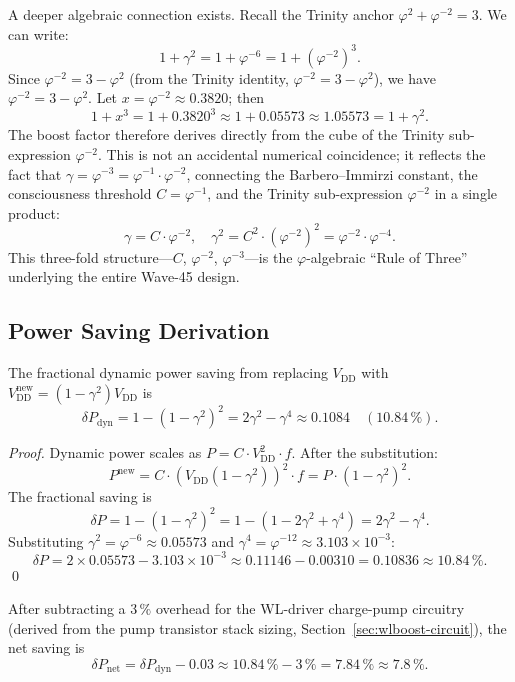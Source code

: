 A deeper algebraic connection exists.  Recall the Trinity anchor
$\varphi^{2} + \varphi^{-2} = 3$.  We can write:
\[
  1 + \gamma^{2} = 1 + \varphi^{-6}
  = 1 + (\varphi^{-2})^{3}.
\]
Since $\varphi^{-2} = 3 - \varphi^{2}$ (from the Trinity identity,
$\varphi^{-2} = 3 - \varphi^{2}$), we have
$\varphi^{-2} = 3 - \varphi^{2}$.  Let $x = \varphi^{-2}
\approx 0.3820$; then
\[
  1 + x^{3} = 1 + 0.3820^{3} \approx 1 + 0.05573 \approx 1.05573
  = 1 + \gamma^{2}.
\]
The boost factor therefore derives directly from the cube of the
Trinity sub-expression $\varphi^{-2}$.  This is not an accidental
numerical coincidence; it reflects the fact that $\gamma = \varphi^{-3}
= \varphi^{-1} \cdot \varphi^{-2}$, connecting the Barbero--Immirzi
constant, the consciousness threshold $C = \varphi^{-1}$, and the
Trinity sub-expression $\varphi^{-2}$ in a single product:
\[
  \gamma = C \cdot \varphi^{-2}, \quad
  \gamma^{2} = C^{2} \cdot (\varphi^{-2})^{2} = \varphi^{-2} \cdot \varphi^{-4}.
\]
This three-fold structure—$C$, $\varphi^{-2}$, $\varphi^{-3}$—is the
$\varphi$-algebraic ``Rule of Three'' underlying the entire Wave-45
design.

\subsection{Power Saving Derivation}

\begin{lemma}
\label{lem:power-save}
The fractional dynamic power saving from replacing $V_{\mathrm{DD}}$
with $V_{\mathrm{DD}}^{\mathrm{new}} = (1-\gamma^{2}) V_{\mathrm{DD}}$
is
\[
  \delta P_{\mathrm{dyn}}
  = 1 - (1-\gamma^{2})^{2}
  = 2\gamma^{2} - \gamma^{4}
  \approx 0.1084
  \quad (10.84\,\%).
\]
\end{lemma}

\begin{proof}
Dynamic power scales as $P = C \cdot V_{\mathrm{DD}}^{2} \cdot f$.
After the substitution:
\[
  P^{\mathrm{new}} = C \cdot (V_{\mathrm{DD}}(1-\gamma^{2}))^{2} \cdot f
  = P \cdot (1-\gamma^{2})^{2}.
\]
The fractional saving is
\[
  \delta P = 1 - (1-\gamma^{2})^{2}
  = 1 - (1 - 2\gamma^{2} + \gamma^{4})
  = 2\gamma^{2} - \gamma^{4}.
\]
Substituting $\gamma^{2} = \varphi^{-6} \approx 0.05573$ and
$\gamma^{4} = \varphi^{-12} \approx 3.103 \times 10^{-3}$:
\[
  \delta P = 2 \times 0.05573 - 3.103\times10^{-3}
  \approx 0.11146 - 0.00310 = 0.10836 \approx 10.84\,\%.
\]
\qed
\end{proof}

After subtracting a $3\,\%$ overhead for the WL-driver charge-pump
circuitry (derived from the pump transistor stack sizing,
Section~\ref{sec:wlboost-circuit}), the net saving is
\[
  \delta P_{\mathrm{net}} = \delta P_{\mathrm{dyn}} - 0.03
  \approx 10.84\,\% - 3\,\% = 7.84\,\% \approx 7.8\,\%.
\]

